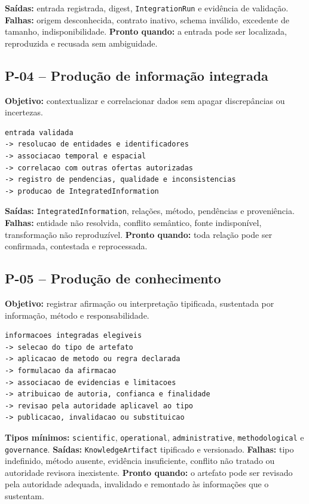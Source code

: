 \documentclass[11pt,a4paper,oneside]{article}
\begin{document}
\textbf{Saídas:} entrada registrada, digest, \texttt{IntegrationRun} e evidência de validação.  
\textbf{Falhas:} origem desconhecida, contrato inativo, schema inválido, excedente de tamanho, indisponibilidade.  
\textbf{Pronto quando:} a entrada pode ser localizada, reproduzida e recusada sem ambiguidade.

\subsection{P-04 -- Produção de informação integrada}
\textbf{Objetivo:} contextualizar e correlacionar dados sem apagar discrepâncias ou incertezas.

\begin{lstlisting}
entrada validada
-> resolucao de entidades e identificadores
-> associacao temporal e espacial
-> correlacao com outras ofertas autorizadas
-> registro de pendencias, qualidade e inconsistencias
-> producao de IntegratedInformation
\end{lstlisting}

\textbf{Saídas:} \texttt{IntegratedInformation}, relações, método, pendências e proveniência.  
\textbf{Falhas:} entidade não resolvida, conflito semântico, fonte indisponível, transformação não reproduzível.  
\textbf{Pronto quando:} toda relação pode ser confirmada, contestada e reprocessada.

\subsection{P-05 -- Produção de conhecimento}
\textbf{Objetivo:} registrar afirmação ou interpretação tipificada, sustentada por informação, método e responsabilidade.

\begin{lstlisting}
informacoes integradas elegiveis
-> selecao do tipo de artefato
-> aplicacao de metodo ou regra declarada
-> formulacao da afirmacao
-> associacao de evidencias e limitacoes
-> atribuicao de autoria, confianca e finalidade
-> revisao pela autoridade aplicavel ao tipo
-> publicacao, invalidacao ou substituicao
\end{lstlisting}

\textbf{Tipos mínimos:} \texttt{scientific}, \texttt{operational}, \texttt{administrative}, \texttt{methodological} e \texttt{governance}.  
\textbf{Saídas:} \texttt{KnowledgeArtifact} tipificado e versionado.  
\textbf{Falhas:} tipo indefinido, método ausente, evidência insuficiente, conflito não tratado ou autoridade revisora inexistente.  
\textbf{Pronto quando:} o artefato pode ser revisado pela autoridade adequada, invalidado e remontado às informações que o sustentam.
\end{document}
